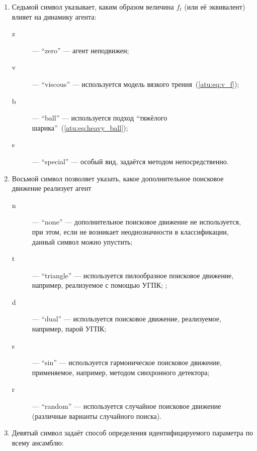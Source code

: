 \begin{enumerate}
  \item
    Седьмой символ указывает, каким образом величина $f_t$ (или её эквивалент) влияет на динамику агента:
    \begin{description}

      \item[z]  --- ``zero'' --- агент неподвижен;

      \item[v] --- ``viscous'' ---  используется модель вязкого трения~(\ref{atu:eq:v_f});

      \item[b] --- ``ball'' --- используется подход ``тяжёлого шарика''~(\ref{atu:eq:heavy_ball});

      \item[s] --- ``special'' --- особый вид, задаётся методом непосредственно.

    \end{description}

  \item
    Восьмой символ позволяет указать, какое дополнительное поисковое движение
    реализует агент
    \begin{description}

      \item[n]  --- ``none'' --- дополнительное поисковое движение не используется,
        при этом, если не возникает неоднозначности в классификации, данный символ можно упустить;

      \item[t] --- ``triangle'' ---  используется пилообразное поисковое движение, например, реализуемое
        с помощью УГПК; ;

      \item[d] --- ``dual'' --- используется поисковое движение, реализуемое, например, парой УГПК;

      \item[s] --- ``sin'' ---  используется гармоническое поисковое движение, применяемое, например, методом синхронного детектора;

      \item[r] --- ``random'' ---  используется случайное поисковое движение (различные варианты случайного поиска).

    \end{description}




  \item
     Девятый символ задаёт способ определения идентифицируемого параметра по всему ансамблю:
    \begin{description}


\end{description}
\end{enumerate}
